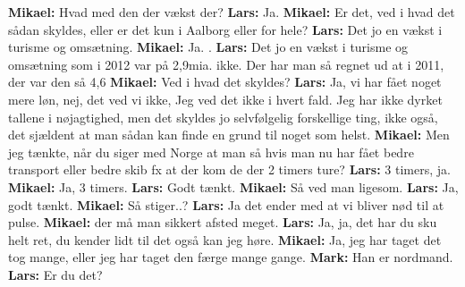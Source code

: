\textbf{Mikael:} Hvad med den der vækst der? \newline
\textbf{Lars:} Ja. \newline
\textbf{Mikael:} Er det, ved i hvad det sådan skyldes, eller er det kun i Aalborg eller for hele? \newline
\textbf{Lars:} Det jo en vækst i turisme og omsætning. \newline
\textbf{Mikael:} Ja. \newline. 
\textbf{Lars:} Det jo en vækst i turisme og omsætning som i 2012 var på 2,9mia. ikke. Der har man så regnet ud at i 2011, der var den så 4,6%
\textbf{Mikael:} Ved i hvad det skyldes? \newline
\textbf{Lars:} Ja, vi har fået noget mere løn, nej, det ved vi ikke, Jeg ved det ikke i hvert fald. Jeg har ikke dyrket tallene i nøjagtighed, men det skyldes jo selvfølgelig forskellige ting, ikke også, det sjældent at man sådan kan finde en grund til noget som helst. \newline
\textbf{Mikael:} Men jeg tænkte, når du siger med Norge at man så hvis man nu har fået bedre transport eller bedre skib fx at der kom de der 2 timers ture? \newline
\textbf{Lars:} 3 timers, ja. \newline
\textbf{Mikael:} Ja, 3 timers. \newline
\textbf{Lars:} Godt tænkt. \newline
\textbf{Mikael:} Så ved man ligesom.\newline
\textbf{Lars:} Ja, godt tænkt. \newline
\textbf{Mikael:} Så stiger..?\newline
\textbf{Lars:} Ja det ender med at vi bliver nød til at pulse. \newline
\textbf{Mikael:} der må man sikkert afsted meget. \newline
\textbf{Lars:} Ja, ja, det har du sku helt ret, du kender lidt til det også kan jeg høre. \newline
\textbf{Mikael:} Ja, jeg har taget det tog mange, eller jeg har taget den færge mange gange. \newline
\textbf{Mark:} Han er nordmand. \newline
\textbf{Lars:} Er du det? \newline
